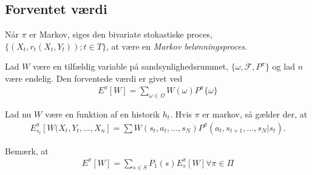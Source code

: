 \subsection{Forventet værdi}
Når $\pi$ er Markov, siges den bivariate stokastiske proces, $\{(X_t,r_t(X_t,Y_t)); t\in T\}$, at være en \textit{Markov belønningsproces}. 

Lad $W$ være en tilfældig variable på sandsynlighedsrummet, $\{\omega, \mathcal{F},P^\pi\}$ og lad $n$ være endelig. 
Den forventede værdi er givet ved
\begin{align*}
    E^\pi [W]=\sum_{\omega\in\Omega} W(\omega)P^\pi\{\omega\}
\end{align*}


Lad nu $W$ være en funktion af en historik $h_t$. Hvis $\pi$ er markov, så gælder der, at
\begin{align*}
    E_{s_t}^\pi [W(X_t,Y_t,\dots, X_n]=\sum W(s_t,a_t,\dots, s_N)P^\pi (a_t,s_{t+1},\dots,s_N|s_t).
\end{align*}

Bemærk, at 
\begin{align*}
    E^\pi[W]=\sum_{s\in S} P_1(s)E_s^\pi [W] \forall\pi\in\Pi
\end{align*}

